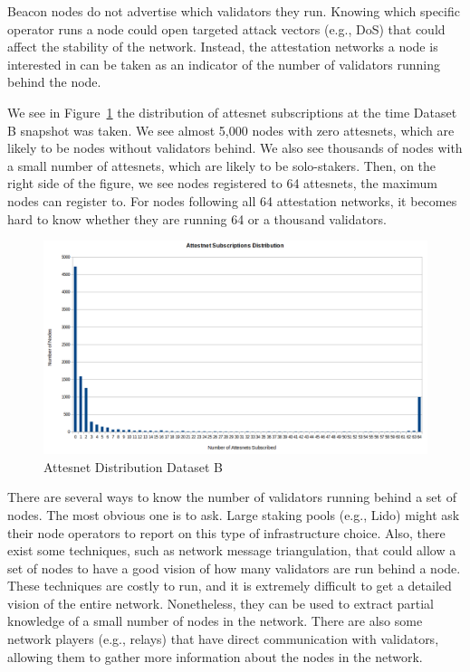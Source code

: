 \documentclass[conference]{IEEEtran}
\begin{document}
Beacon nodes do not advertise which validators they run. Knowing which specific operator runs a node could open targeted attack vectors (e.g., DoS) that could affect the stability of the network. Instead, the attestation networks a node is interested in can be taken as an indicator of the number of validators running behind the node.

We see in Figure~\ref{fig:attesnets} the distribution of attesnet subscriptions at the time Dataset B snapshot was taken. We see almost 5,000 nodes with zero attesnets, which are likely to be nodes without validators behind. We also see thousands of nodes with a small number of attesnets, which are likely to be solo-stakers. Then, on the right side of the figure, we see nodes registered to 64 attesnets, the maximum nodes can register to. For nodes following all 64 attestation networks, it becomes hard to know whether they are running 64 or a thousand validators. 

\begin{figure}[htbp]
    \centering
    \includegraphics[width=0.95\linewidth]{figures/attesnets.png}
    \caption{Attesnet Distribution Dataset B}
    \label{fig:attesnets}
\end{figure}

There are several ways to know the number of validators running behind a set of nodes. The most obvious one is to ask. Large staking pools (e.g., Lido) might ask their node operators to report on this type of infrastructure choice. Also, there exist some techniques, such as network message triangulation, that could allow a set of nodes to have a good vision of how many validators are run behind a node. These techniques are costly to run, and it is extremely difficult to get a detailed vision of the entire network. Nonetheless, they can be used to extract partial knowledge of a small number of nodes in the network. There are also some network players (e.g., relays) that have direct communication with validators, allowing them to gather more information about the nodes in the network.
\end{document}
